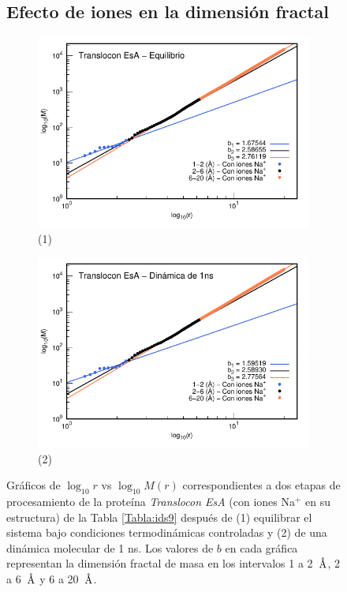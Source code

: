 	\begin{figure}[H]
		\subsection{Efecto de iones en la dimensi\'{o}n fractal}
		\label{EfectoIones}	
		\centering
		\begin{subfigure}{0.49\textwidth}
			\centering
			\includegraphics[width=\linewidth,page=1]{graphs/PDBs/7khw/ions/7khwEq-wions.pdf}
			\caption{(1)}
		\end{subfigure}
		\hfill
		\begin{subfigure}{0.49\textwidth}
			\centering
			\includegraphics[width=\linewidth,page=1]{graphs/PDBs/7khw/ions/7khw1ns-wions.pdf}
			\caption{(2)}
		\end{subfigure}
		\caption{Gr\'{a}ficos de $\log_{10}r$ vs $\log_{10}M(r)$ correspondientes a dos etapas de procesamiento de la prote\'{i}na \textit{Translocon EsA} (con iones Na$^{+}$ en su estructura) de la Tabla \ref{Tabla:ids9} despu\'{e}s de (1) equilibrar el sistema bajo condiciones termodin\'{a}micas controladas y (2) de una din\'{a}mica molecular de 1 ns. Los valores de $b$ en cada gr\'{a}fica representan la dimensi\'{o}n fractal de masa en los intervalos 1 a 2~$\textup{\r{A}}$, 2 a 6~$\textup{\r{A}}$ y 6 a 20~$\textup{\r{A}}$.}
		\label{fig:7khw-wions}
	\end{figure}
	
